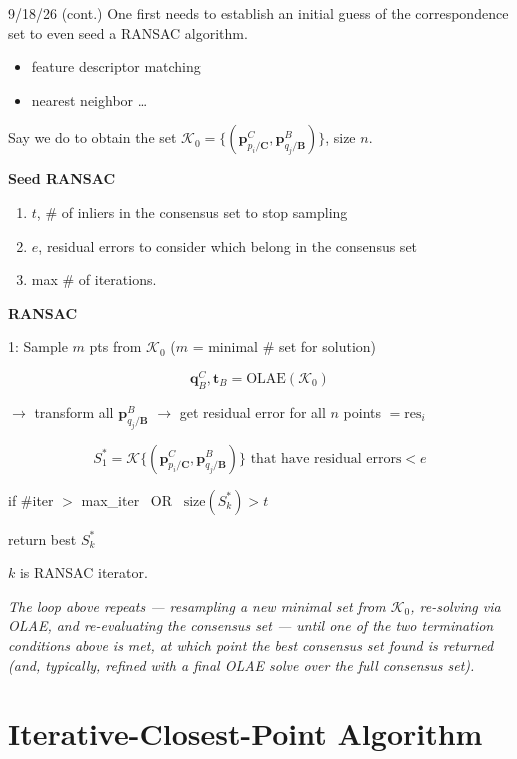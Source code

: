 \documentclass{article}
\newcommand{\vect}[1]{\mathbf{#1}}
\newcommand{\mat}[1]{\mathbf{#1}}
\newcommand{\TCB}{\mat{T}^C_{B}}
\newcommand{\pBjB}{\vect{p}^{\mathit{B}}_{q_{j}/\mathbf{B}}}
\newcommand{\pCiC}{\vect{p}^{\mathit{C}}_{p_{i}/\mathbf{C}}}
\newcommand{\pBCC}{\vect{p}^{\mathit{C}}_{\mathbf{B}/\mathbf{C}}}
\newcommand{\Kmat}{\mat{K}} %
\newcommand{\corrSet}{\mathcal{K}} %
\newcommand{\qCB}{\vect{q}^{C}_{B}} %
\newcommand{\tB}{\vect{t}_B} %
\begin{document}
\begin{authornotes}{9/18/26 (cont.)}
One first needs to establish an initial guess of the correspondence set to even seed a RANSAC algorithm.
\begin{itemize}
    \item feature descriptor matching
    \item nearest neighbor \dots
\end{itemize}

Say we do to obtain the set $\corrSet_0 = \{ (\pCiC, \pBjB) \}$, size $n$.

\textbf{Seed RANSAC}
\begin{enumerate}
    \item $t$, \# of inliers in the consensus set to stop sampling
    \item $e$, residual errors to consider which belong in the consensus set
    \item max \# of iterations.
\end{enumerate}

\textbf{RANSAC}

1: Sample $m$ pts from $\corrSet_0$ \quad ($m$ = minimal \# set for solution)

\begin{equation}
    \qCB, \tB = \mathrm{OLAE}(\corrSet_0)
\end{equation}

$\rightarrow$ transform all $\pBjB$ $\rightarrow$ get residual error for all $n$ points $= \mathrm{res}_i$

\begin{equation}
    S_1^* = \corrSet \{ (\pCiC, \pBjB) \} \text{ that have residual errors} < e
\end{equation}

if \#iter $>$ max\_iter \ OR \ $\mathrm{size}(S_k^*) > t$

\quad return best $S_k^*$

$k$ is RANSAC iterator.
\end{authornotes}

\bigskip
\noindent\textit{The loop above repeats --- resampling a new minimal set from $\corrSet_0$, re-solving via OLAE, and re-evaluating the consensus set --- until one of the two termination conditions above is met, at which point the best consensus set found is returned (and, typically, refined with a final OLAE solve over the full consensus set).}

\newpage
\section{Iterative-Closest-Point Algorithm}
\label{sec:icp}
\end{document}

